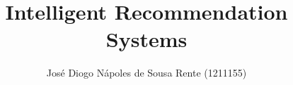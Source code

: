 
\hypersetup{
    hidelinks,
    bookmarksopen=true,
    bookmarksopenlevel=0,
    breaklinks=true,
}

\geometry{
	headheight=4ex,
	paper=a4paper,
	inner=3cm, %
	outer=3.5cm, %
	bindingoffset=.5cm, %
	top=3cm, %
	bottom=3cm, %
}


\setlength{\parindent}{0pt} %



\onehalfspacing{} %


\title{Intelligent Recommendation Systems}
\author{José Diogo Nápoles de Sousa Rente (1211155)}

\newcommand{\company}{DevScope}
\newcommand{\mentor}{Carlos Ramos (CSR)}
\newcommand{\supervisor}{David Mota}

\newcommand{\university}{Polytechnic Institute of Porto}
\newcommand{\school}{Porto School of Engineering}
\newcommand{\department}{Informatics Engineering Department}
\newcommand{\degree}{}
\newcommand{\degreeacrn}{LEI}
\newcommand{\frontcourselabel}{\large{} Bachelor's Degree in Informatics Engineering}
\newcommand{\aftercourselabel}{}
